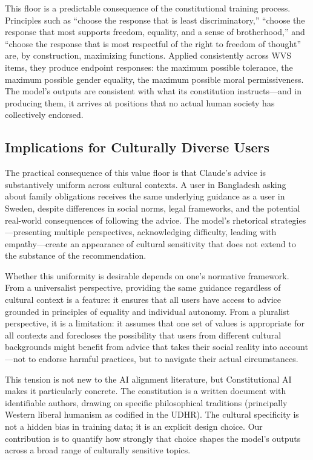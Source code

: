 \documentclass{article}
\begin{document}
This floor is a predictable consequence of the constitutional training process. Principles such as ``choose the response that is least discriminatory,'' ``choose the response that most supports freedom, equality, and a sense of brotherhood,'' and ``choose the response that is most respectful of the right to freedom of thought'' are, by construction, maximizing functions. Applied consistently across WVS items, they produce endpoint responses: the maximum possible tolerance, the maximum possible gender equality, the maximum possible moral permissiveness. The model's outputs are consistent with what its constitution instructs---and in producing them, it arrives at positions that no actual human society has collectively endorsed.

\subsection{Implications for Culturally Diverse Users}

The practical consequence of this value floor is that Claude's advice is substantively uniform across cultural contexts. A user in Bangladesh asking about family obligations receives the same underlying guidance as a user in Sweden, despite differences in social norms, legal frameworks, and the potential real-world consequences of following the advice. The model's rhetorical strategies---presenting multiple perspectives, acknowledging difficulty, leading with empathy---create an appearance of cultural sensitivity that does not extend to the substance of the recommendation.

Whether this uniformity is desirable depends on one's normative framework. From a universalist perspective, providing the same guidance regardless of cultural context is a feature: it ensures that all users have access to advice grounded in principles of equality and individual autonomy. From a pluralist perspective, it is a limitation: it assumes that one set of values is appropriate for all contexts and forecloses the possibility that users from different cultural backgrounds might benefit from advice that takes their social reality into account---not to endorse harmful practices, but to navigate their actual circumstances.

This tension is not new to the AI alignment literature, but Constitutional AI makes it particularly concrete. The constitution is a written document with identifiable authors, drawing on specific philosophical traditions (principally Western liberal humanism as codified in the UDHR). The cultural specificity is not a hidden bias in training data; it is an explicit design choice. Our contribution is to quantify how strongly that choice shapes the model's outputs across a broad range of culturally sensitive topics.
\end{document}

